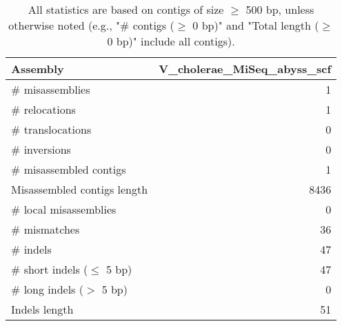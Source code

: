 \documentclass[12pt,a4paper]{article}
\begin{document}
\begin{table}[ht]
\begin{center}
\caption{All statistics are based on contigs of size $\geq$ 500 bp, unless otherwise noted (e.g., "\# contigs ($\geq$ 0 bp)" and "Total length ($\geq$ 0 bp)" include all contigs).}
\begin{tabular}{|l*{1}{|r}|}
\hline
Assembly & V\_cholerae\_MiSeq\_abyss\_scf \\ \hline
\# misassemblies & 1 \\ \hline
\hspace{5mm}\# relocations & 1 \\ \hline
\hspace{5mm}\# translocations & 0 \\ \hline
\hspace{5mm}\# inversions & 0 \\ \hline
\# misassembled contigs & 1 \\ \hline
Misassembled contigs length & 8436 \\ \hline
\# local misassemblies & 0 \\ \hline
\# mismatches & 36 \\ \hline
\# indels & 47 \\ \hline
\hspace{5mm}\# short indels ($\leq$ 5 bp) & 47 \\ \hline
\hspace{5mm}\# long indels ($>$ 5 bp) & 0 \\ \hline
Indels length & 51 \\ \hline
\end{tabular}
\end{center}
\end{table}
\end{document}
